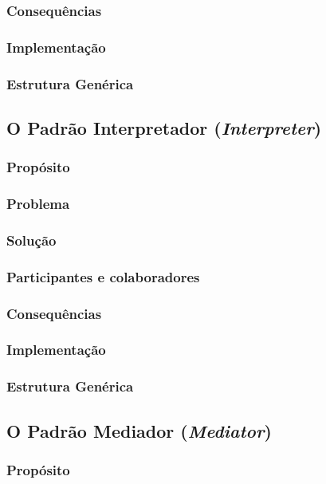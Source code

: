 \documentclass[
	11pt,				%
	openright,
	twoside,			%
	a4paper,			%
	english,			%
	french,
	brazil,				%
	sumario=tradicional
	]{abntex2}
\begin{document}
\subsubsection{Consequências}
\subsubsection{Implementação}
\subsubsection{Estrutura Genérica}

\subsection{O Padrão Interpretador (\textit{Interpreter})}
\subsubsection{Propósito}
\subsubsection{Problema}
\subsubsection{Solução}
\subsubsection{Participantes e colaboradores}
\subsubsection{Consequências}
\subsubsection{Implementação}
\subsubsection{Estrutura Genérica}

\subsection{O Padrão Mediador (\textit{Mediator})}
\subsubsection{Propósito}
\end{document}

